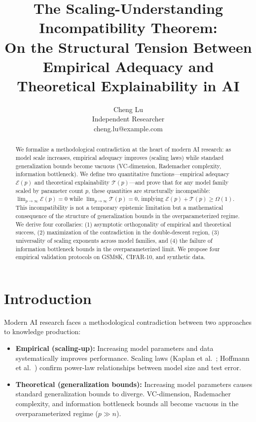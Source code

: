 \documentclass[12pt]{article}
\theoremstyle{definition}
\theoremstyle{remark}
\begin{document}
\title{The Scaling-Understanding Incompatibility Theorem: \\ On the Structural Tension Between Empirical Adequacy and Theoretical Explainability in AI}

\author{Cheng Lu\\
Independent Researcher\\
cheng.lu@example.com}

\date{}

\maketitle

\begin{abstract}
We formalize a methodological contradiction at the heart of modern AI research: as model scale increases, empirical adequacy improves (scaling laws) while standard generalization bounds become vacuous (VC-dimension, Rademacher complexity, information bottleneck). We define two quantitative functions---empirical adequacy $\mathcal{E}(p)$ and theoretical explainability $\mathcal{T}(p)$---and prove that for any model family scaled by parameter count $p$, these quantities are structurally incompatible: $\lim_{p \to \infty} \mathcal{E}(p) = 0$ while $\lim_{p \to \infty} \mathcal{T}(p) = 0$, implying $\mathcal{E}(p) + \mathcal{T}(p) \geq \Omega(1)$. This incompatibility is not a temporary epistemic limitation but a mathematical consequence of the structure of generalization bounds in the overparameterized regime. We derive four corollaries: (1) asymptotic orthogonality of empirical and theoretical success, (2) maximization of the contradiction in the double-descent region, (3) universality of scaling exponents across model families, and (4) the failure of information bottleneck bounds in the overparameterized limit. We propose four empirical validation protocols on GSM8K, CIFAR-10, and synthetic data.
\end{abstract}

\section{Introduction}

Modern AI research faces a methodological contradiction between two approaches to knowledge production:

\begin{itemize}
  \item \textbf{Empirical (scaling-up):} Increasing model parameters and data systematically improves performance. Scaling laws (Kaplan et al.~\cite{kaplan2020scaling}; Hoffmann et al.~\cite{hoffmann2022training}) confirm power-law relationships between model size and test error.
  \item \textbf{Theoretical (generalization bounds):} Increasing model parameters causes standard generalization bounds to diverge. VC-dimension, Rademacher complexity, and information bottleneck bounds all become vacuous in the overparameterized regime ($p \gg n$).
\end{itemize}
\end{document}
